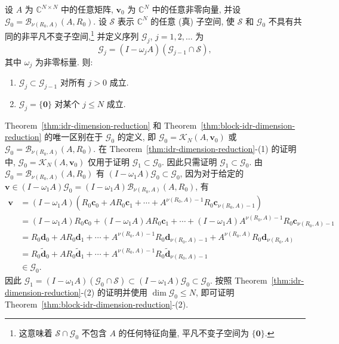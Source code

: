 \begin{Theorem}\label{thm:block-idr-dimension-reduction}
{设 $A$ 为 $\mathbb C^{N\times N}$ 中的任意矩阵, $\bm v_0$ 为 $\mathbb C^N$ 中的任意非零向量, 并设 $\mathcal G_0=\mathcal B_{\nu(R_0,A)}(A,R_0)$. 设 $\mathcal S$ 表示 $\mathbb C^N$ 的任意 (真) 子空间, 使 $\mathcal S$ 和 $\mathcal G_0$ 不具有共同的非平凡不变子空间,}\footnote{{这意味着 $\mathcal S\cap\mathcal G_0$ 不包含 $A$ 的任何特征向量, 平凡不变子空间为 $\{\bm0\}$.}}
{并定义序列 $\mathcal G_j$, $j=1,2,\ldots$ 为}
\begin{equation}\label{eq:block-idr-subspace-recurrence}\mathcal G_j=(I-\omega_jA)(\mathcal G_{j-1}\cap\mathcal S),\end{equation}
{其中 $\omega_j$ 为非零标量. 则:}
\begin{enumerate}[label=(\arabic*)]
\item $\mathcal G_j\subset\mathcal G_{j-1}$ {对所有 $j>0$ 成立.}
\item $\mathcal G_j=\{\bm0\}$ {对某个 $j\le N$ 成立.}
\end{enumerate}\end{Theorem}
\begin{Proof}
{Theorem\ \ref{thm:idr-dimension-reduction} 和 Theorem\ \ref{thm:block-idr-dimension-reduction} 的唯一区别在于 $\mathcal G_0$ 的定义, 即 $\mathcal G_0=\mathcal K_N(A,\bm v_0)$ 或 $\mathcal G_0=\mathcal B_{\nu(R_0,A)}(A,R_0)$. 在 Theorem\ \ref{thm:idr-dimension-reduction}-(1) 的证明中, $\mathcal G_0=\mathcal K_N(A,\bm v_0)$ 仅用于证明 $\mathcal G_1\subset\mathcal G_0$. 因此只需证明 $\mathcal G_1\subset\mathcal G_0$. 由 $\mathcal G_0=\mathcal B_{\nu(R_0,A)}(A,R_0)$ 有 $(I-\omega_1A)\mathcal G_0\subset\mathcal G_0$, 因为对于给定的 $\bm v\in(I-\omega_1A)\mathcal G_0=(I-\omega_1A)\mathcal B_{\nu(R_0,A)}(A,R_0)$, 有}
\[\begin{aligned}\bm v&=(I-\omega_1A)(R_0\bm c_0+AR_0\bm c_1+\cdots+A^{\nu(R_0,A)-1}R_0\bm c_{\nu(R_0,A)-1})\\&=(I-\omega_1A)R_0\bm c_0+(I-\omega_1A)AR_0\bm c_1+\cdots+(I-\omega_1A)A^{\nu(R_0,A)-1}R_0\bm c_{\nu(R_0,A)-1}\\&=R_0\bm d_0+AR_0\bm d_1+\cdots+A^{\nu(R_0,A)-1}R_0\bm d_{\nu(R_0,A)-1}+A^{\nu(R_0,A)}R_0\bm d_{\nu(R_0,A)}\\&=R_0\widetilde{\bm d}_0+AR_0\widetilde{\bm d}_1+\cdots+A^{\nu(R_0,A)-1}R_0\widetilde{\bm d}_{\nu(R_0,A)-1}\\&\in\mathcal G_0.\end{aligned}\]
{因此 $\mathcal G_1=(I-\omega_1A)(\mathcal G_0\cap\mathcal S)\subset(I-\omega_1A)\mathcal G_0\subset\mathcal G_0$.}
{按照 Theorem\ \ref{thm:idr-dimension-reduction}-(2) 的证明并使用 $\dim\mathcal G_0\le N$, 即可证明 Theorem\ \ref{thm:block-idr-dimension-reduction}-(2).}
\par\nopagebreak[4]
\end{Proof}
